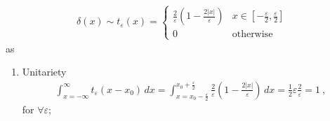 \documentclass[letterpaper,10pt,english]{jupyterBook}
\begin{document}
\begin{equation*}
\begin{split}\delta(x) \sim t_{\varepsilon}(x) = \begin{cases} \frac{2}{\varepsilon} \left( 1 - \frac{2 |x|}{\varepsilon} \right) & x \in \left[-\frac{\varepsilon}{2}, \frac{\varepsilon}{2} \right] \\ 0 & \text{otherwise} \end{cases}\end{split}
\end{equation*}
\sphinxAtStartPar
as
\begin{enumerate}
%
\item {} 
\sphinxAtStartPar
Unitariety
\begin{equation*}
\begin{split}\int_{x=-\infty}^{\infty} t_{\varepsilon}(x-x_0) \, dx = \int_{x=x_0-\frac{\varepsilon}{2}}^{x_0+\frac{\varepsilon}{2}} \frac{2}{\varepsilon} \left( 1 - \frac{2 |x|}{\varepsilon} \right) \, dx = \frac{1}{2} \varepsilon \frac{2}{\varepsilon} = 1 \ ,  \end{split}
\end{equation*}
\sphinxAtStartPar
for \(\forall \varepsilon\);


\end{enumerate}
\end{document}
